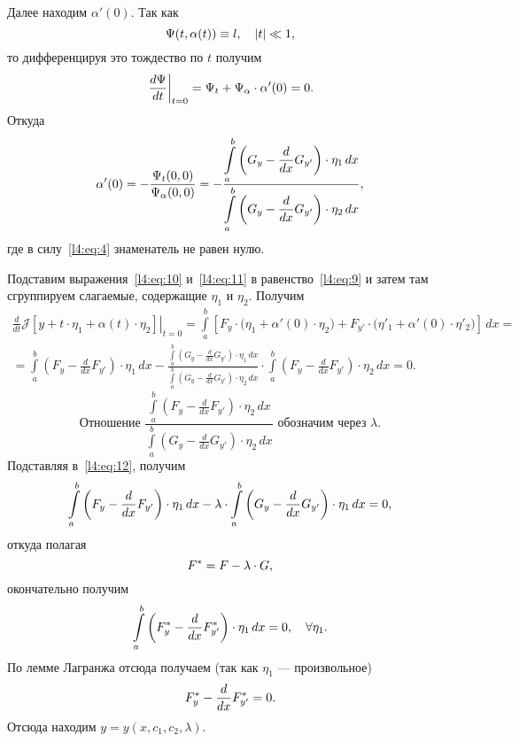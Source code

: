 \documentclass[12pt,a4paper,openany,fleqn]{book}
\newcommand{\J}{\ensuremath{\mathcal{J}}}
\newcommand{\der}[2]{\ensuremath{\frac{d#1}{d#2}}}
\theoremstyle{definition}
\begin{document}
Далее находим $\alpha'(0)$. Так как 
\begin{equation*}
	\hfill\Psi(t,\alpha(t))\equiv l,\quad|t|\ll1,\hfill
\end{equation*}
то дифференцируя это тождество по $t$ получим
\begin{equation*}
	\hfill\left.\der{\Psi}{t}\right|_{t=0}=\Psi_t+\Psi_{\alpha}\cdot\alpha'(0)=0.\hfill
\end{equation*}
Откуда
\begin{equation}
	\label{l4:eq:11}
	\hfill\alpha'(0)=-\frac{\Psi_t(0,0)}{\Psi_{\alpha}(0,0)}=-\frac{\displaystyle\int\limits_a^b\left(G_y-\der{}{x}G_{y'}\right)\cdot\eta_1\,dx}{\displaystyle\int\limits_a^b\left(G_y-\der{}{x}G_{y'}\right)\cdot\eta_2\,dx},\hfill
\end{equation}
где в силу~\eqref{l4:eq:4} знаменатель не равен нулю.

Подставим выражения~\eqref{l4:eq:10} и~\eqref{l4:eq:11} в равенство~\eqref{l4:eq:9} и затем там сгруппируем слагаемые, содержащие $\eta_1$ и $\eta_2$. Получим
\begin{multline}
	\label{l4:eq:12}
	\left.\der{}{t}\J[y+t\cdot\eta_1+\alpha(t)\cdot\eta_2]\right|_{t=0}=\int\limits_a^b\left[F_y\cdot\big(\eta_1+\alpha'(0)\cdot\eta_2\big)+F_{y'}\cdot\big(\eta'_1+\alpha'(0)\cdot\eta'_2\big)\right]\,dx=\\
	=\int\limits_a^b\left(F_y-\der{}{x}F_{y'}\right)\cdot\eta_1\,dx-\frac{\displaystyle\int\limits_a^b\left(G_y-\der{}{x}G_{y'}\right)\cdot\eta_1\,dx}{\displaystyle\int\limits_a^b\left(G_y-\der{}{x}G_{y'}\right)\cdot\eta_2\,dx}\cdot\int\limits_a^b\left(F_y-\der{}{x}F_{y'}\right)\cdot\eta_2\,dx=0.
\end{multline}  
\begin{equation*}
	\text{Отношение }\frac{\displaystyle\int\limits_a^b\left(F_y-\der{}{x}F_{y'}\right)\cdot\eta_2\,dx}{\displaystyle\int\limits_a^b\left(G_y-\der{}{x}G_{y'}\right)\cdot\eta_2\,dx}\text{ обозначим через }\lambda.
\end{equation*}
Подставляя в~\eqref{l4:eq:12}, получим
\begin{equation*}
	\hfill\int\limits_a^b\left(F_y-\der{}{x}F_{y'}\right)\cdot\eta_1\,dx-\lambda\cdot\int\limits_a^b\left(G_y-\der{}{x}G_{y'}\right)\cdot\eta_1\,dx=0,\hfill
\end{equation*} 
откуда полагая
\begin{equation*}
	\hfill F^{\ast}=F-\lambda\cdot G,\hfill
\end{equation*}
окончательно получим
\begin{equation}
	\label{l4:eq:13}
	\hfill\int\limits_a^b\left(F^{\ast}_y-\der{}{x}F^{\ast}_{y'}\right)\cdot\eta_1\,dx=0,\quad\forall\eta_1.\hfill
\end{equation} 
По лемме Лагранжа отсюда получаем (так как $\eta_1$ --- произвольное)
\begin{equation}
	\label{l4:eq:14}
	\hfill F^{\ast}_y-\der{}{x}F^{\ast}_{y'}=0.\hfill
\end{equation}
Отсюда находим $y=y(x,c_1,c_2,\lambda)$. 
\end{document}
